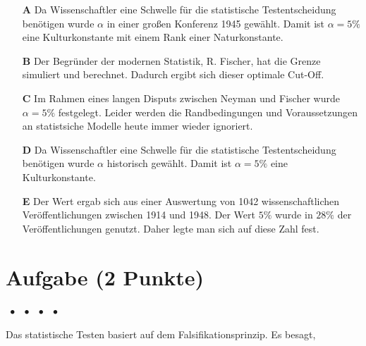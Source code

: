 \documentclass[a4paper, 9pt]{scrartcl}\usepackage[]{graphicx}\usepackage[]{xcolor}
\begin{document}
\begin{enumerate}
\item [\textbf{A} \msquare] Da Wissenschaftler eine Schwelle für die statistische Testentscheidung benötigen wurde $\alpha$ in einer großen Konferenz 1945 gewählt. Damit ist $\alpha = 5\%$ eine Kulturkonstante mit einem Rank einer Naturkonstante.
\item [\textbf{B} \msquare] Der Begründer der modernen Statistik, R. Fischer, hat die Grenze simuliert und berechnet. Dadurch ergibt sich dieser optimale Cut-Off.
\item [\textbf{C} \msquare] Im Rahmen eines langen Disputs zwischen Neyman und Fischer wurde $\alpha = 5\%$ festgelegt. Leider werden die Randbedingungen und Voraussetzungen an statistsiche Modelle heute immer wieder ignoriert.
\item [\textbf{D} \msquare] Da Wissenschaftler eine Schwelle für die statistische Testentscheidung benötigen wurde $\alpha$ historisch gewählt. Damit ist $\alpha = 5\%$ eine Kulturkonstante.
\item [\textbf{E} \msquare] Der Wert ergab sich aus einer Auswertung von 1042 wissenschaftlichen Veröffentlichungen zwischen 1914 und 1948. Der Wert $5\%$ wurde in $28\%$ der Veröffentlichungen genutzt. Daher legte man sich auf diese Zahl fest.
\end{enumerate} 

\section{Aufgabe \hfill (2 Punkte)}

\ifcollection
\begin{flushright}
\tiny\vspace{-2Ex}
\textbf{\examinhaltstart}
\exammodulemathstat $\;\bullet$
\exammodulestat $\;\bullet$
\exammodulestatbbv $\;\bullet$
\exammodulestatversuch $\;\bullet$
\exammodulebiostat
\vspace{-1Ex}
\end{flushright}
\fi




Das statistische Testen basiert auf dem Falsifikationsprinzip. Es besagt,
\end{document}

